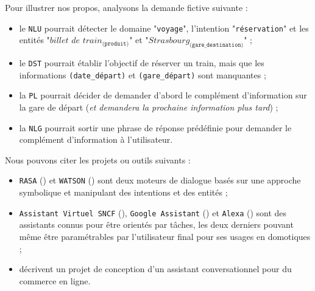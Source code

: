 		\begin{leftBarExamples}
			Pour illustrer nos propos, analysons la demande fictive suivante :
			\begin{quote}
				\begin{center}
				\end{center}
			\end{quote}
			\begin{itemize}
				\item le \texttt{NLU} pourrait détecter le domaine "\texttt{voyage}", l'intention "\texttt{réservation}" et les entités "$\textit{billet de train}_{\texttt{(produit)}}$" et "$\textit{Strasbourg}_{\texttt{(gare\_destination)}}$" ;
				\item le \texttt{DST} pourrait établir l'objectif de réserver un train, mais que les informations \texttt{(date\_départ)} et \texttt{(gare\_départ)} sont manquantes ;
				\item la \texttt{PL} pourrait décider de demander d'abord le complément d'information sur la gare de départ (\textit{et demandera la prochaine information plus tard}) ;
				\item la \texttt{NLG} pourrait sortir une phrase de réponse prédéfinie pour demander le complément d'information à l'utilisateur.
			\end{itemize}
		\end{leftBarExamples}
			
		\begin{leftBarExamples}
			Nous pouvons citer les projets ou outils suivants :
			\begin{itemize}
				\item \texttt{RASA} (\cite{bocklisch-etal:2017:rasa-open-source}) et \texttt{WATSON} (\cite{hoyt-etal:2016:ibm-watson-analytics}) sont deux moteurs de dialogue basés sur une approche symbolique et manipulant des intentions et des entités ;
				\item \texttt{Assistant Virtuel SNCF} (\cite{sncf:2018:agent-virtuel-sncf}), \texttt{Google Assistant} (\cite{google:2016:google-assistant-your}) et \texttt{Alexa} (\cite{alexa-internet:2018:keyword-research-competitor}) sont des assistants connus pour être orientés par tâches, les deux derniers pouvant même être paramétrables par l'utilisateur final pour ses usages en domotiques ;
				\item \cite{yan-etal:2017:building-taskoriented-dialogue} décrivent un projet de conception d'un assistant conversationnel pour du commerce en ligne.
			\end{itemize}
		\end{leftBarExamples}
		
